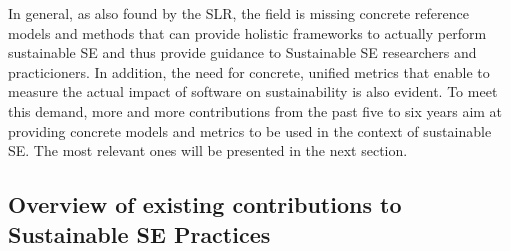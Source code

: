 \documentclass[oribibl]{llncs}
\begin{document}
In general, as also found by the SLR, the field is missing concrete reference models and methods that can provide holistic frameworks to actually perform sustainable SE \cite{penzenstadler_sustainability_2012} and thus provide guidance to Sustainable SE researchers and practicioners. %
In addition, the need for concrete, unified metrics that enable to measure the actual impact of software on sustainability is also evident. %
To meet this demand, more and more contributions from the past five to six years aim at providing concrete models and metrics to be used in the context of sustainable SE. The most relevant ones will be presented in the next section.

\subsection{Overview of existing contributions to Sustainable SE Practices\label{overviewContributions}}%
\end{document}
